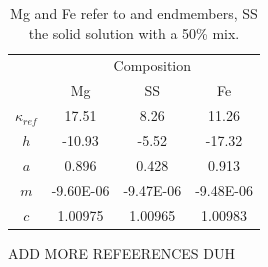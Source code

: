 \begin{table}[]
\begin{tabular}{c|ccc}
                           & \multicolumn{3}{c}{Composition}    \\
                           & Mg             & SS           & Fe           \\ \hline
$\kappa_{ref}$  & 17.51         & 8.26        & 11.26      \\
$h$                     & -10.93        & -5.52       & -17.32     \\
$a$                     & 0.896         & 0.428       & 0.913     \\
$m$                    & -9.60E-06  & -9.47E-06 & -9.48E-06 \\
$c$                      & 1.00975    & 1.00965    & 1.00983
\end{tabular}
\caption[CONTENTS BIT?]{\label{tab:comp-table}Mg and Fe refer to \mgsios and \fesios endmembers, SS the solid solution with a 50\% mix.}
\end{table}






ADD MORE REFEERENCES DUH














\pagebreak


